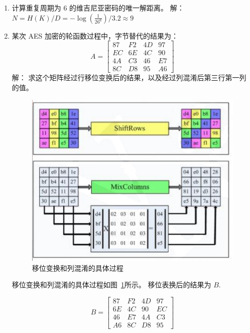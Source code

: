 \documentclass[degree=project,degree-type=project,cjk-font=noto]{thuthesis}
\begin{document}
\begin{enumerate}
\item 计算重复周期为 6 的维吉尼亚密码的唯一解距离。
\newline
{\heiti 解：}
\newline
$N = H(K) / D = - \log (\frac{1}{26^6}) / 3.2 \approx 9$
\newline

\item 某次 AES 加密的轮函数过程中，字节替代的结果为：
\begin{equation}
  A = \begin{bmatrix}
  87 & F2 & 4D & 97 \\
  EC & 6E & 4C & 90 \\
  4A & C3 & 46 & E7 \\
  8C & D8 & 95 & A6
  \end{bmatrix}
\end{equation}
{\heiti 解：}
\newline
求这个矩阵经过行移位变换后的结果，以及经过列混淆后第三行第一列的值。

\begin{figure}[!htp]
\centering%
\includegraphics[width=.7\linewidth]{aes.png}
  \caption{移位变换和列混淆的具体过程}
  \label{fig:aes}
\end{figure}

移位变换和列混淆的具体过程如图~\ref{fig:aes}所示。
移位表换后的结果为 $B$.

\begin{equation}
  B = \begin{bmatrix}
  87 & F2 & 4D & 97 \\
  6E & 4C & 90 & EC \\
  46 & E7 & 4A & C3 \\
  A6 & 8C & D8 & 95
  \end{bmatrix}
\end{equation}


\end{enumerate}
\end{document}
